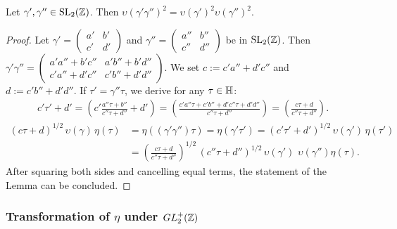 \documentclass{article}
\begin{document}
\begin{Lemma}
\label{thm:matix-splitting}
Let $\gamma',\gamma''\in \SL2Z$.
%
Then $\upsilon(\gamma'\gamma'')^2 = \upsilon(\gamma')^2 \upsilon(\gamma'')^2$.
\end{Lemma}
\begin{proof}
  Let
  $\gamma'=\left(\begin{smallmatrix}a'&b'\\c'&d'\end{smallmatrix}\right)$
  and
  $\gamma''=\left(\begin{smallmatrix}a''&b''\\c''&d''\end{smallmatrix}\right)$
  be in $\SL2Z$.
  Then
  $\gamma'\gamma'' =
  \left(
    \begin{smallmatrix}
      a'a''+b'c'' & a'b''+b'd''\\
      c'a''+d'c'' & c'b''+d'd''
    \end{smallmatrix}
  \right)$.
  We set $c:=c'a''+d'c''$ and $d:=c'b''+d'd''$.
%
  If $\tau'=\gamma''\tau$, we derive for any $\tau \in \mathbb{H}$:
  \begin{gather*}
    c' \tau' + d'
    =
      \left(c' \frac{a''\tau + b''}{c''\tau + d''} +d'\right)
    =
      \left(\frac{c'a''\tau + c'b''+ d'c''\tau + d'd''}{c''\tau + d''}\right)
    =
    \left(\frac{c\tau + d}{c''\tau + d''}\right).
  \end{gather*}
%
  \begin{align*}
    (c \tau + d)^{1/2}\,\upsilon(\gamma)\,\eta(\tau)
    &=
    \eta((\gamma'\gamma'')\tau) =
    \eta(\gamma'\tau')
    =
      (c'\tau'+d')^{1/2}\,\upsilon(\gamma')\,\eta(\tau')\\
    &=
      \left(\frac{c\tau + d}{c''\tau + d''}\right)^{1/2} \,(c''\tau+d'')^{1/2}
      \,\upsilon(\gamma')\,\,\upsilon(\gamma'')\eta(\tau).
  \end{align*}
  After squaring both sides and cancelling equal terms, the statement
  of the Lemma can be concluded.
\end{proof}



\subsubsection{Transformation of $\eta$ under $GL_2^+(\mathbb{Z})$}
\label{sec:eta-transformation}
\end{document}
